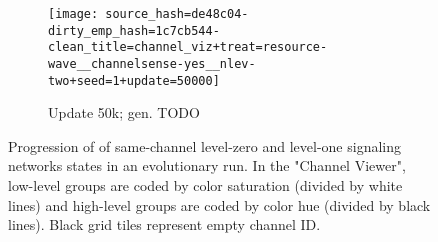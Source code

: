 \begin{figure}[!htbp]
\begin{center}
\begin{subfigure}[b]{0.49\columnwidth}
  \texttt{[image: source\_hash=de48c04-dirty\_emp\_hash=1c7cb544-clean\_title=channel\_viz+treat=resource-wave\_\_channelsense-yes\_\_nlev-two+seed=1+update=50000]}
  \caption{Update 50k; gen. TODO}
  \label{fig:TODO}
\end{subfigure}
\caption{
Progression of of same-channel level-zero and level-one signaling networks states in an evolutionary run.
In the "Channel Viewer", low-level groups are coded by color saturation (divided by white lines) and high-level groups are coded by color hue (divided by black lines).
Black grid tiles represent empty channel ID.
}
\label{fig:grid_progression}
\end{center}
\end{figure}
